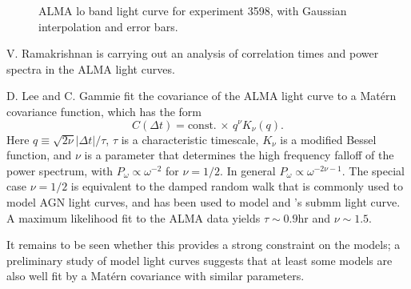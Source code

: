\documentclass[twocolumn,tighten,dvipsnames]{aastex63}
\begin{document}
\begin{figure}
  \caption{ALMA lo band light curve for experiment 3598, with Gaussian interpolation and error bars.}
  \label{fig:LC3598}
\end{figure}

V. Ramakrishnan is carrying out an analysis of correlation times and power spectra in the ALMA light curves.

D. Lee and C. Gammie fit the covariance of the ALMA light curve to a Mat\'ern covariance function, which has the form
\begin{equation}
  C(\Delta t) = \mbox{const.} \, \times \, q^\nu K_\nu(q).
\end{equation}
Here $q \equiv \sqrt{2\nu} |\Delta t|/\tau$, $\tau$ is a characteristic timescale, $K_\nu$ is a modified Bessel function, and $\nu$ is a parameter that determines the high frequency falloff of the power spectrum, with $P_\omega \propto \omega^{-2}$ for $\nu = 1/2$.  In general $P_\omega \propto \omega^{-2\nu - 1}$. The special case $\nu = 1/2$ is equivalent to the damped random walk that is commonly used to model AGN light curves, and has been used to model \sgra and 's submm light curve. A maximum likelihood fit to the ALMA data yields $\tau \sim 0.9$hr and $\nu \sim 1.5$.

It remains to be seen whether this provides a strong constraint on the models; a preliminary study of model light curves suggests that at least some models are also well fit by a Mat\'ern covariance with similar parameters.
\end{document}
